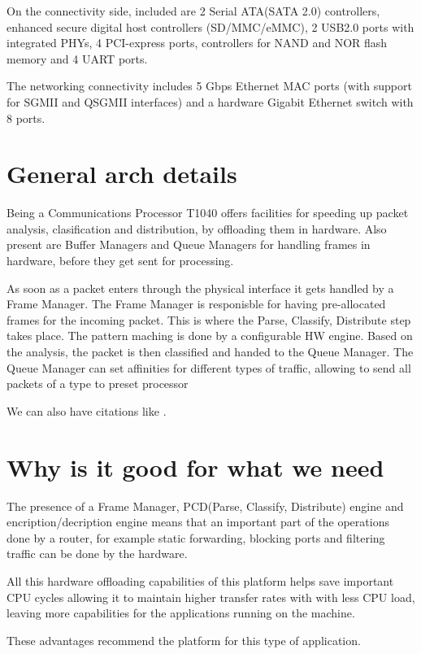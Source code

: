
On the connectivity side, included are 2 Serial ATA(SATA 2.0) controllers,
enhanced secure digital host controllers (SD/MMC/eMMC), 2 USB2.0 ports
with integrated PHYs, 4 PCI-express ports, controllers for NAND and NOR
flash memory and 4 UART ports.


The networking connectivity includes 5 Gbps Ethernet MAC ports (with support for
SGMII and QSGMII interfaces) and a hardware Gigabit Ethernet switch with 8 ports.

\section{General arch details}
\label{sub-sec:arch-details}

Being a Communications Processor T1040 offers facilities for speeding up
packet analysis, clasification and distribution, by offloading 
them in hardware. Also present are Buffer Managers and Queue Managers 
for handling frames in hardware, before they get sent for processing.


As soon as a packet enters through the physical interface it gets handled 
by a Frame Manager. The Frame Manager is responisble for having pre-allocated
frames for the incoming packet. This is where the Parse, Classify, Distribute
step takes place. The pattern maching is done by a configurable HW engine.
Based on the analysis, the packet is then classified and handed to the
Queue Manager. The Queue Manager can set affinities for different types of
traffic, allowing to send all packets of a type to preset processor

We can also have citations like \cite{iso-odf}.

\section{Why is it good for what we need}

The presence of a Frame Manager, PCD(Parse, Classify, Distribute) engine
and encription/decription engine means that an important part of 
the operations done by a router, for example static forwarding, 
blocking ports and filtering traffic can be done by the hardware.

All this hardware offloading capabilities of this platform helps save 
important CPU cycles allowing it to maintain higher transfer rates with with
less CPU load, leaving more capabilities for the applications running on the
machine. 

These advantages recommend the platform for this type of application.
